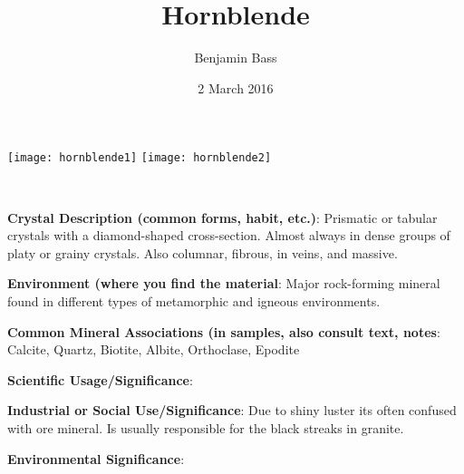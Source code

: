 \documentclass[10pt]{article}
\author{Benjamin Bass}
\date{2 March 2016}
\title{\vspace{-2.0cm}Hornblende} %
\begin{document}
\maketitle


\begin{center}
  \texttt{[image: hornblende1]}
  \texttt{[image: hornblende2]}
\end{center}



\
\
\
\
\
\
\
\
\
\

\begin{framed}
  \textbf{Crystal Description (common forms, habit, etc.)}: Prismatic or tabular crystals with a diamond-shaped cross-section. Almost always in dense groups of platy or grainy crystals. Also columnar, fibrous, in veins, and massive.
\end{framed}

\begin{framed}
  \textbf{Environment (where you find the material}: Major rock-forming mineral found in different types of metamorphic and igneous environments.
\end{framed}

\begin{framed}
  \textbf{Common Mineral Associations (in samples, also consult text, notes}: Calcite, Quartz, Biotite, Albite, Orthoclase, Epodite
\end{framed}

\begin{framed}
  \textbf{Scientific Usage/Significance}: 
\end{framed}

\begin{framed}
  \textbf{Industrial or Social Use/Significance}: Due to shiny luster its often confused with ore mineral. Is usually responsible for the black streaks in granite.
\end{framed}

\begin{framed}
  \textbf{Environmental Significance}: 
\end{framed}

\end{document}
